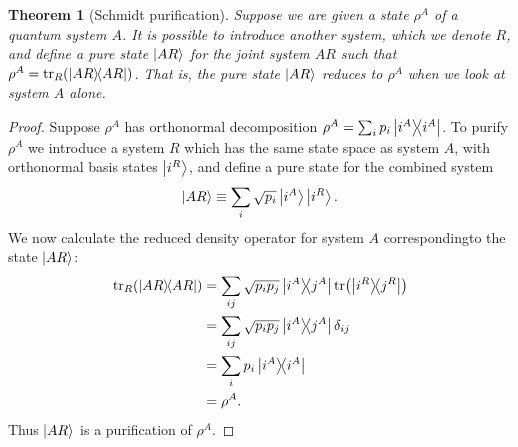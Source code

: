 \documentclass{article}
\newtheorem{theorem}{Theorem}
\numberwithin{theorem}{section}
\numberwithin{corollary}{section}
\numberwithin{postulate}{section}
\begin{document}
\begin{theorem}[Schmidt purification]
  Suppose we are given a state $\rho^A$ of a quantum system $A$. It is possible
  to introduce another system, which we denote $R$, and define a pure state
  $\ket{AR}$ for the joint system $AR$ such that $\rho^A = \tr_R(\op{AR})$. That
  is, the pure state $\ket{AR}$ reduces to $\rho^A$ when we look at system $A$
  alone.
\end{theorem}
\begin{proof}
  Suppose $\rho^A$ has orthonormal decomposition $\rho^A = \sum_i p_i\op{i^A}$.
  To purify $\rho^A$ we introduce a system $R$ which has the same state space as
  system $A$, with orthonormal basis states $\ket{i^R}$, and define a pure state
  for the combined system \[
    \ket{AR} \equiv \sum_i \sqrt{p_i}\ket{i^A}\ket{i^R}.
  \] We now calculate the reduced density operator for system $A$ correspondingto the state $\ket{AR}$:
  \begin{align*}
    \tr_R(\op{AR}) &= \sum_{ij} \sqrt{p_ip_j}\op{i^A}{j^A}\tr(\op{i^R}{j^R}) \\
                   &= \sum_{ij} \sqrt{p_ip_j}\op{i^A}{j^A}\delta_{ij} \\
                   &= \sum_{i} p_i\op{i^A} \\
                   &= \rho^A.
  \end{align*}
  Thus $\ket{AR}$ is a purification of $\rho^A$.
\end{proof}
\end{document}
